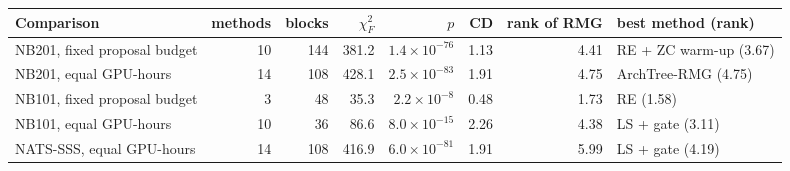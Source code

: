 \begin{tabular}{@{}lrrrrrrl@{}}
\toprule
Comparison & methods & blocks & $\chi^2_F$ & $p$ & CD & rank of RMG & best method (rank)\\
\midrule
NB201, fixed proposal budget & 10 & 144 & 381.2 & $1.4\times10^{-76}$ & 1.13 & 4.41 & RE + ZC warm-up (3.67)\\
NB201, equal GPU-hours & 14 & 108 & 428.1 & $2.5\times10^{-83}$ & 1.91 & 4.75 & ArchTree-RMG (4.75)\\
NB101, fixed proposal budget & 3 & 48 & 35.3 & $2.2\times10^{-8}$ & 0.48 & 1.73 & RE (1.58)\\
NB101, equal GPU-hours & 10 & 36 & 86.6 & $8.0\times10^{-15}$ & 2.26 & 4.38 & LS + gate (3.11)\\
NATS-SSS, equal GPU-hours & 14 & 108 & 416.9 & $6.0\times10^{-81}$ & 1.91 & 5.99 & LS + gate (4.19)\\
\bottomrule
\end{tabular}
